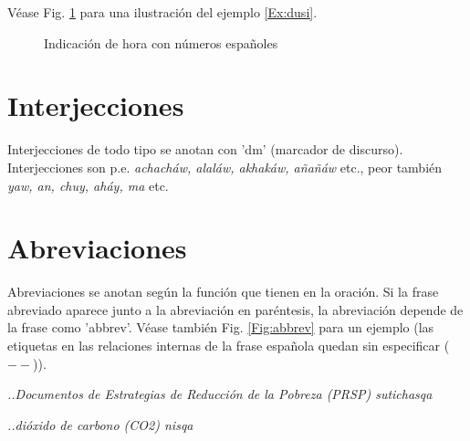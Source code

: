 \documentclass[a4paper,11pt,DIV12]{scrartcl}
\begin{document}
V\'ease Fig. \ref{Fig:hora} para una ilustraci\'on del ejemplo \ref{Ex:dusi}.

\begin{figure}
\begin{center}
 \caption{Indicaci\'on de hora con n\'umeros espa\~noles}\label{Fig:hora}
\end{center}
\end{figure}

\section{Interjecciones}
Interjecciones de todo tipo se anotan con 'dm' (marcador de discurso). Interjecciones son p.e. {\em achach\'aw, alal\'aw, akhak\'aw, a\~na\~n\'aw} etc., peor tambi\'en {\em yaw, an, chuy, ah\'ay, ma} etc.

\section{Abreviaciones}

Abreviaciones se anotan seg\'un la funci\'on que tienen en la oraci\'on. Si la frase abreviado aparece junto a la abreviaci\'on en par\'entesis, la abreviaci\'on depende de la frase como 'abbrev'. V\'ease tambi\'en Fig. \ref{Fig:abbrev} para un ejemplo (las etiquetas en las relaciones internas de la frase espa\~nola quedan sin especificar ($--$)).

\begin{examples}
 \item {\em ..Documentos de Estrategias de Reducción de la Pobreza (PRSP) sutichasqa}
  \item {\em ..dióxido de carbono (CO2) nisqa}
\end{examples}
\end{document}
